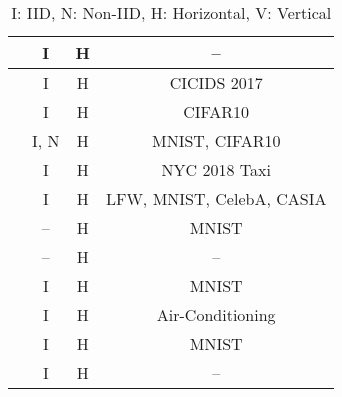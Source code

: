 \begin{table}[ht]
\begin{tabular}{c|c|c|c}
\cite{9079513}                      & I                 & H              & --                                 \\ \hline
\cite{app8122663}                   & I                 & H              & CICIDS 2017                        \\ \hline
\cite{9347812}                      & I                 & H              & CIFAR10                            \\ \hline
\cite{9134967}                      & I, N              & H              & MNIST, CIFAR10                     \\ \hline
\cite{baffle}                       & I                 & H              & NYC 2018 Taxi                      \\ \hline
\cite{9210531}                      & I                 & H              & LFW, MNIST, CelebA, CASIA          \\ \hline
\cite{8894364}                      & --                & H              & MNIST                              \\ \hline
\cite{10.48550/arxiv.2112.07938}    & --                & H              & --                                 \\ \hline
\cite{demo}                         & I                 & H              & MNIST                              \\ \hline
\cite{9233457}                      & I                 & H              & Air-Conditioning                   \\ \hline
\cite{9170559}                      & I                 & H              & MNIST                              \\ \hline
\cite{pirate}                       & I                 & H              & --                                 \\ \hline
\end{tabular}
\caption*{I: IID, N: Non-IID, H: Horizontal, V: Vertical}
\end{table}
